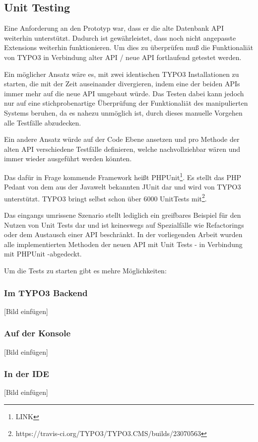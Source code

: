 \subsection{Unit Testing}
Eine Anforderung an den Prototyp war, dass er die alte Datenbank API weiterhin unterstützt. Dadurch ist gewährleistet, dass noch nicht angepasste Extensions weiterhin funktionieren. Um dies zu überprüfen muß die Funktionaliät von TYPO3 in Verbindung alter API / neue API fortlaufend getestet werden.

Ein möglicher Ansatz wäre es, mit zwei identischen TYPO3 Installationen zu starten, die mit der Zeit auseinander divergieren, indem eine der beiden APIs immer mehr auf die neue API umgebaut würde. Das Testen dabei kann jedoch nur auf eine stichprobenartige Überprüfung der Funktionaliät des manipulierten Systems beruhen, da es nahezu unmöglich ist, durch dieses manuelle Vorgehen alle Testfälle abzudecken.

Ein andere Ansatz würde auf der Code Ebene ansetzen und pro Methode der alten API verschiedene Testfälle definieren, welche nachvollziehbar wären und immer wieder ausgeführt werden könnten.

Das dafür in Frage kommende Framework heißt PHPUnit\footnote{LINK}. Es stellt das PHP Pedant von dem aus der Javawelt bekannten JUnit dar und wird von TYPO3 unterstützt. TYPO3 bringt selbst schon über 6000 UnitTests mit\footnote{https://travis-ci.org/TYPO3/TYPO3.CMS/builds/23070563}. 

Das eingangs umrissene Szenario stellt lediglich ein greifbares Beispiel für den Nutzen von Unit Tests dar und ist keineswegs auf Spezialfälle wie Refactorings oder dem Austausch einer API beschränkt. In der vorliegenden Arbeit wurden alle implementierten Methoden der neuen API mit Unit Tests - in Verbindung mit PHPUnit -abgedeckt. 

Um die Tests zu starten gibt es mehre Möglichkeiten:

\subsubsection{Im TYPO3 Backend}
[Bild einfügen]

\subsubsection{Auf der Konsole}
[Bild einfügen]

\subsubsection{In der IDE}
[Bild einfügen]

